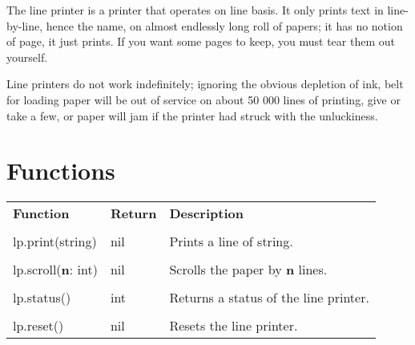 The line printer is a printer that operates on line basis. It only prints text in line-by-line, hence the name, on almost endlessly long roll of papers; it has no notion of page, it just prints. If you want some pages to keep, you must tear them out yourself.

Line printers do not work indefinitely; ignoring the obvious depletion of ink, belt for loading paper will be out of service on about 50 000 lines of printing, give or take a few, or paper will jam if the printer had struck with the unluckiness.

\section{Functions}

\begin{tabularx}{\textwidth}{l l X}
	\textbf{\large Function} & \textbf{\large Return} & \textbf{\large Description}
	\\ \\
	\endhead
	lp.print(string) & nil & Prints a line of string.
	\\ \\
	lp.scroll(\textbf{n}: int) & nil & Scrolls the paper by \textbf{n} lines.
	\\ \\
	lp.status() & int & Returns a status of the line printer.
	\\ \\
	lp.reset() & nil & Resets the line printer.
\end{tabularx}